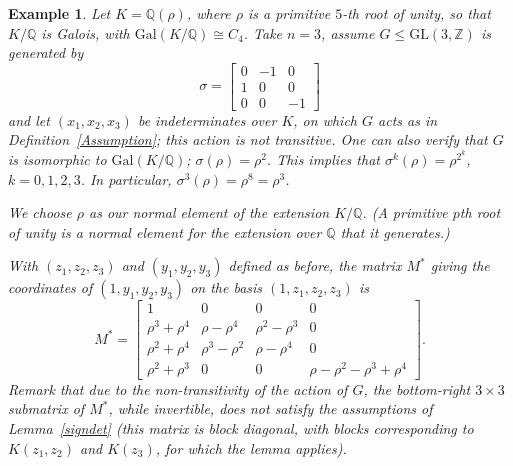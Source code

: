 \documentclass[12pt]{article}
\theoremstyle{plain}
\newtheorem{example}[theorem]{Example}
\newcommand{\Z}{\ensuremath{\mathbb{Z}}}
\newcommand{\Q}{\ensuremath{\mathbb{Q}}}
\begin{document}
\begin{example}
Let $K= \Q(\rho)$, where $\rho$ is a primitive $5$-th root of unity,
so that $K/\Q$ is Galois, with $\mathrm{Gal}(K/\Q) \cong C_4$.
Take $n=3$, assume $G\leq \mathrm{GL}(3,\Z)$ is generated by $$
\sigma = \begin{bmatrix}
0&-1&0\\
1&0&0\\
0&0&-1
\end{bmatrix}$$ and let $(x_1, x_2, x_3)$ be
indeterminates over $K$, on which $G$ acts as in Definition~\ref{Assumption};
this action is not transitive.
One can also verify that $G$ is isomorphic to $\mathrm{Gal}(K/\Q)$;
$\sigma(\rho)=\rho^2$.  This implies that $\sigma^k(\rho)=\rho^{2^k}$, $k=0,1,2,3$.
In particular, $\sigma^3(\rho)=\rho^{8}=\rho^3$.

We choose $\rho$ as our normal element of the extension $K/\Q$.
(A primitive $p$th root of unity is a normal element for the extension over $\Q$ that it generates.)

With $(z_1,z_2,z_3)$ and $(y_1,y_2,y_3)$
defined as before, the matrix $M^*$ giving the coordinates of
$(1,y_1,y_2,y_3)$ on the basis $(1,z_1,z_2,z_3)$ is
$$M^*= \begin{bmatrix}
1 &0&0&0\\
\rho^3+\rho^4 & \rho -\rho^4 & \rho^2 -\rho^3 & 0\\
\rho^2+\rho^4 & \rho^3 -\rho^2 & \rho -\rho^4 &0 \\
\rho^2+\rho^3 &0 &0 & \rho - \rho^2 -\rho^3+\rho^4
\end{bmatrix}.
$$ Remark that due to the non-transitivity of the action of $G$, the
bottom-right $3 \times 3$ submatrix of $M^*$, while invertible, does
not satisfy the assumptions of Lemma~\ref{signdet} (this matrix is
block diagonal, with blocks corresponding to $K(z_1,z_2)$ and
$K(z_3)$, for which the lemma applies).
\end{example}




\end{document}
